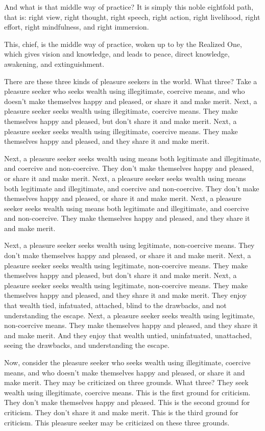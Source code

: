 \documentclass[12pt,openany]{book}%
\begin{document}
And what is that middle way of practice? It is simply this noble eightfold path, that is: right view, right thought, right speech, right action, right livelihood, right effort, right mindfulness, and right immersion. 

This, chief, is the middle way of practice, woken up to by the Realized One, which gives vision and knowledge, and leads to peace, direct knowledge, awakening, and extinguishment. 

There are these three kinds of pleasure seekers in the world. What three? Take a pleasure seeker who seeks wealth using illegitimate, coercive means, and who doesn’t make themselves happy and pleased, or share it and make merit. Next, a pleasure seeker seeks wealth using illegitimate, coercive means. They make themselves happy and pleased, but don’t share it and make merit. Next, a pleasure seeker seeks wealth using illegitimate, coercive means. They make themselves happy and pleased, and they share it and make merit. 

Next, a pleasure seeker seeks wealth using means both legitimate and illegitimate, and coercive and non-coercive. They don’t make themselves happy and pleased, or share it and make merit. Next, a pleasure seeker seeks wealth using means both legitimate and illegitimate, and coercive and non-coercive. They don’t make themselves happy and pleased, or share it and make merit. Next, a pleasure seeker seeks wealth using means both legitimate and illegitimate, and coercive and non-coercive. They make themselves happy and pleased, and they share it and make merit. 

Next, a pleasure seeker seeks wealth using legitimate, non-coercive means. They don’t make themselves happy and pleased, or share it and make merit. Next, a pleasure seeker seeks wealth using legitimate, non-coercive means. They make themselves happy and pleased, but don’t share it and make merit. Next, a pleasure seeker seeks wealth using legitimate, non-coercive means. They make themselves happy and pleased, and they share it and make merit. They enjoy that wealth tied, infatuated, attached, blind to the drawbacks, and not understanding the escape. Next, a pleasure seeker seeks wealth using legitimate, non-coercive means. They make themselves happy and pleased, and they share it and make merit. And they enjoy that wealth untied, uninfatuated, unattached, seeing the drawbacks, and understanding the escape. 

Now, consider the pleasure seeker who seeks wealth using illegitimate, coercive means, and who doesn’t make themselves happy and pleased, or share it and make merit. They may be criticized on three grounds. What three? They seek wealth using illegitimate, coercive means. This is the first ground for criticism. They don’t make themselves happy and pleased. This is the second ground for criticism. They don’t share it and make merit. This is the third ground for criticism. This pleasure seeker may be criticized on these three grounds. 
\end{document}
